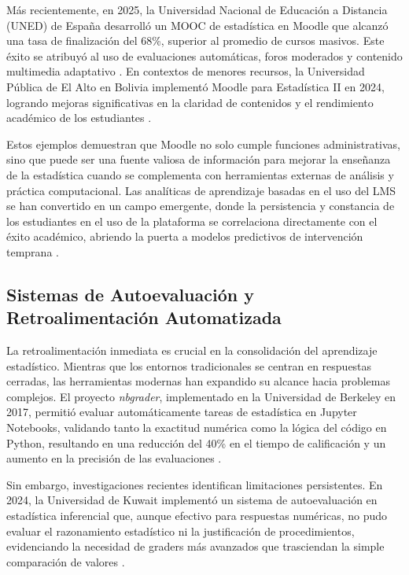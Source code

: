\documentclass[letter,oneside,12pt,spanish]{report}
\begin{document}
Más recientemente, en 2025, la Universidad Nacional de Educación a Distancia (UNED) de España desarrolló un MOOC de estadística en Moodle que alcanzó una tasa de finalización del 68\%, superior al promedio de cursos masivos. Este éxito se atribuyó al uso de evaluaciones automáticas, foros moderados y contenido multimedia adaptativo \parencite{Goh2025}. En contextos de menores recursos, la Universidad Pública de El Alto en Bolivia implementó Moodle para Estadística II en 2024, logrando mejoras significativas en la claridad de contenidos y el rendimiento académico de los estudiantes \parencite{Ndibalema2025}.

Estos ejemplos demuestran que Moodle no solo cumple funciones administrativas, sino que puede ser una fuente valiosa de información para mejorar la enseñanza de la estadística cuando se complementa con herramientas externas de análisis y práctica computacional. Las analíticas de aprendizaje basadas en el uso del LMS se han convertido en un campo emergente, donde la persistencia y constancia de los estudiantes en el uso de la plataforma se correlaciona directamente con el éxito académico, abriendo la puerta a modelos predictivos de intervención temprana \parencite{Goh2025}.

\subsection{Sistemas de Autoevaluación y Retroalimentación Automatizada}
La retroalimentación inmediata es crucial en la consolidación del aprendizaje estadístico. Mientras que los entornos tradicionales se centran en respuestas cerradas, las herramientas modernas han expandido su alcance hacia problemas complejos. El proyecto \textit{nbgrader}, implementado en la Universidad de Berkeley en 2017, permitió evaluar automáticamente tareas de estadística en Jupyter Notebooks, validando tanto la exactitud numérica como la lógica del código en Python, resultando en una reducción del 40\% en el tiempo de calificación y un aumento en la precisión de las evaluaciones \parencite{Blank2017}.

Sin embargo, investigaciones recientes identifican limitaciones persistentes. En 2024, la Universidad de Kuwait implementó un sistema de autoevaluación en estadística inferencial que, aunque efectivo para respuestas numéricas, no pudo evaluar el razonamiento estadístico ni la justificación de procedimientos, evidenciando la necesidad de graders más avanzados que trasciendan la simple comparación de valores \parencite{AlHaddad2024}.
\end{document}
